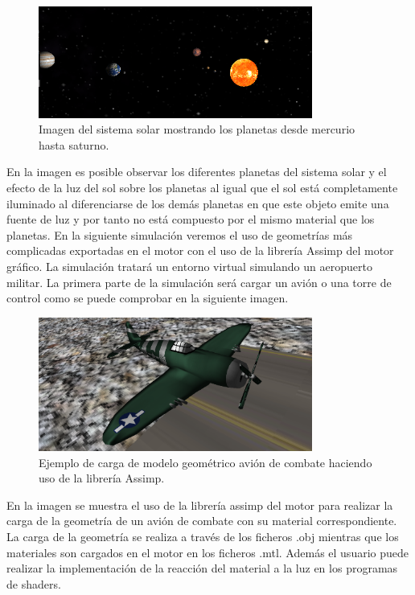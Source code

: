 \documentclass[a4paper]{book}
\begin{document}
\begin{figure}[H]
    \centering
    \includegraphics[width=9cm, keepaspectratio]{img/SistemaSolar.png}
    \caption{Imagen del sistema solar mostrando los planetas desde mercurio hasta saturno.}
    \label{SistemaSolar}
\end{figure}

En la imagen es posible observar los diferentes planetas del sistema solar y el efecto de la luz del sol sobre los planetas al igual que
el sol está completamente iluminado al diferenciarse de los demás planetas en que este objeto emite una fuente de luz y por tanto no está
compuesto por el mismo material que los planetas. En la siguiente simulación veremos el uso de geometrías más complicadas exportadas
en el motor con el uso de la librería Assimp del motor gráfico. La simulación tratará un entorno virtual simulando un aeropuerto militar.
La primera parte de la simulación será cargar un avión o una torre de control como se puede comprobar en la siguiente imagen.

\begin{figure}[H]
    \centering
    \includegraphics[width=9cm, keepaspectratio]{img/Airplane.png}
    \caption{Ejemplo de carga de modelo geométrico avión de combate haciendo uso de la librería Assimp.}
    \label{Airplane}
\end{figure}

En la imagen se muestra el uso de la librería assimp del motor para realizar la carga de la geometría de un avión de combate con su
material correspondiente. La carga de la geometría se realiza a través de los ficheros .obj mientras que los materiales son cargados
en el motor en los ficheros .mtl. Además el usuario puede realizar la implementación de la reacción del material a la luz en los programas
de shaders.
\end{document}
